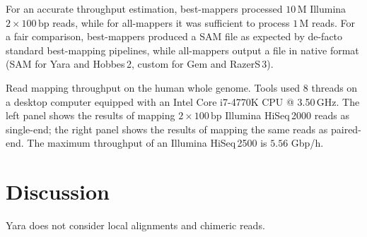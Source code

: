 For an accurate throughput estimation, best-mappers processed $10\,\text{M}$ Illumina $2 \times 100\,\text{bp}$ reads, while for all-mappers it was sufficient to process $1\,\text{M}$ reads.
For a fair comparison, best-mappers produced a SAM file as expected by de-facto standard best-mapping pipelines, while all-mappers output a file in native format (SAM for Yara and Hobbes\,2, custom for Gem and RazerS\,3).


\begin{table*}[t]
  \caption[Yara throughput on real data]
  {
    \label{tab:yara:throughput}
    Read mapping throughput on the human whole genome.
    Tools used 8 threads on a desktop computer equipped with an Intel Core i7-4770K CPU @ 3.50\,GHz.
    The left panel shows the results of mapping $2 \times 100\,\text{bp}$ Illumina HiSeq\,2000 reads as single-end;
    the right panel shows the results of mapping the same reads as paired-end.
    The maximum throughput of an Illumina HiSeq\,2500 is $5.56$ Gbp/h.
  }
	\vspace{-3mm}
	\center
	\sffamily
		\renewcommand{\tabcolsep}{0.8ex}
		
\end{table*}



\section{Discussion}

Yara does not consider local alignments and chimeric reads.
